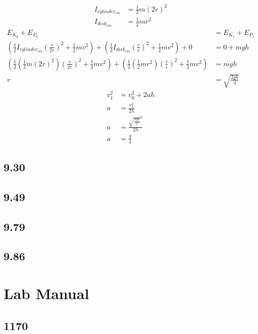 \documentclass{article}
\begin{document}
\begin{align*}
	I_{cylinder_{cm}} & = \frac{1}{2}m(2r)^2 \\
	I_{disk_{cm}} & = \frac{1}{2}mr^2
\end{align*}
\begin{align*}
	E_{K_0} + E_{P_0} & = E_{K_1} + E_{P_1} \\
	\left( \frac{1}{2}I_{cylinder_{cm}} \left( \frac{v}{2r} \right)^2 + \frac{1}{2}mv^2 \right) + \left( \frac{1}{2}I_{disk_{cm}} \left( \frac{v}{r} \right)^2 + \frac{1}{2}mv^2 \right) + 0 & = 0 + mgh \\
	\left( \frac{1}{2} \left( \frac{1}{2}m(2r)^2 \right) \left( \frac{v}{2r} \right)^2 + \frac{1}{2}mv^2 \right) + \left( \frac{1}{2} \left( \frac{1}{2}mr^2 \right) \left( \frac{v}{r} \right)^2 + \frac{1}{2}mv^2 \right) & = mgh \\
	v & = \sqrt{ \frac{ 2gh }{ 3 } }
\end{align*}
\begin{align*}
	v_1^2 & = v_0^2 + 2ah \\
	a & = \frac{ v_1^2 }{ 2h } \\
	a & = \frac{ \sqrt{ \frac{ 2gh }{ 3 } }^2 }{ 2h } \\
	a & = \frac{ g }{ 3 }
\end{align*}

\subsection{9.30}

\subsection{9.49}

\subsection{9.79}

\subsection{9.86}

\section{Lab Manual}

\subsection{1170}
\end{document}

